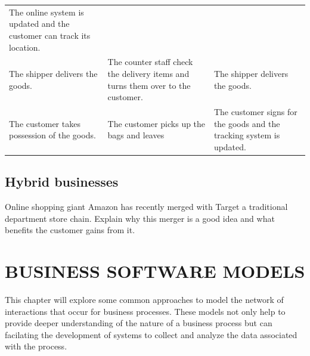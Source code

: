 \documentclass[]{book}
\let\BeginKnitrBlock\begin \let\EndKnitrBlock\end
\begin{document}
\begin{longtable}[]{@{}lll@{}}
\begin{minipage}[t]{0.38\columnwidth}
The online system is updated and the customer can track its location.\strut
\end{minipage}\tabularnewline
\begin{minipage}[t]{0.15\columnwidth}\raggedright
The shipper delivers the goods.\strut
\end{minipage} & \begin{minipage}[t]{0.38\columnwidth}\raggedright
The counter staff check the delivery items and turns them over to the customer.\strut
\end{minipage} & \begin{minipage}[t]{0.38\columnwidth}\raggedright
The shipper delivers the goods.\strut
\end{minipage}\tabularnewline
\begin{minipage}[t]{0.15\columnwidth}\raggedright
The customer takes possession of the goods.\strut
\end{minipage} & \begin{minipage}[t]{0.38\columnwidth}\raggedright
The customer picks up the bags and leaves\strut
\end{minipage} & \begin{minipage}[t]{0.38\columnwidth}\raggedright
The customer signs for the goods and the tracking system is updated.\strut
\end{minipage}\tabularnewline
\bottomrule
\end{longtable}

\BeginKnitrBlock{rmddiscussion}
\hypertarget{hybrid-businesses}{%
\section{Hybrid businesses}\label{hybrid-businesses}}

Online shopping giant Amazon has recently merged with Target a traditional department store chain. Explain why this merger is a good idea and what benefits the customer gains from it.
\EndKnitrBlock{rmddiscussion}

\hypertarget{business-software-models}{%
\chapter{BUSINESS SOFTWARE MODELS}\label{business-software-models}}

This chapter will explore some common approaches to model the network of interactions that occur for business processes. These models not only help to provide deeper understanding of the nature of a business process but can facilating the development of systems to collect and analyze the data associated with the process.
\end{document}
